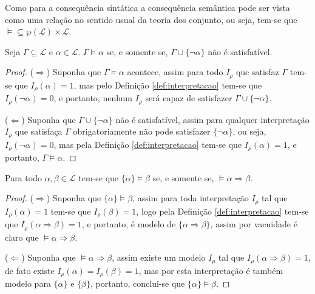 \begin{dica}
  Como para a consequência sintática a consequência semântica pode ser vista como uma relação no sentido usual da teoria dos conjunto, ou seja, tem-se que $\vDash \subseteq \wp(\mathcal{L}) \times \mathcal{L}$.
\end{dica}

\begin{teorema}\label{teo:TeoremaRefutacao}
  Seja $\Gamma \subseteq \mathcal{L}$ e $\alpha \in \mathcal{L}$. $\Gamma \vDash \alpha$ se, e somente se, $\Gamma \cup \{\neg \alpha\}$ não é satisfatível. 
\end{teorema}

\begin{proof}
  ($\Rightarrow$) Suponha que  $\Gamma \vDash \alpha$ acontece, assim para todo $I_\rho$ que satisfaz $\Gamma$ tem-se que $I_\rho(\alpha) = 1$, mas pelo Definição \ref{def:interpretacao} tem-se que $I_\rho(\neg \alpha) = 0$, e portanto, nenhum $I_\rho$ será capaz de satisfazer $\Gamma \cup \{\neg \alpha\}$. 
  
  ($\Leftarrow$) Suponha que $\Gamma \cup \{\neg \alpha\}$ não é satisfatível, assim para qualquer interpretação $I_\rho$ que satisfaça $\Gamma$ obrigatoriamente não pode satisfazer $\{\neg \alpha\}$, ou seja, $I_\rho(\neg \alpha) = 0$, mas pela Definição \ref{def:interpretacao} tem-se que $I_\rho( \alpha) = 1$, e portanto, $\Gamma \vDash \alpha$.
\end{proof}

\begin{teorema}\label{teo:TeoremaDeducaoSemantico}
  Para todo $\alpha, \beta \in \mathcal{L}$ tem-se que $\{\alpha\} \vDash \beta$ se, e somente se,  $\vDash \alpha \Rightarrow \beta$.
\end{teorema}

\begin{proof}
  ($\Rightarrow$) Suponha que $\{\alpha\} \vDash \beta$, assim para toda interpretação $I_\rho$ tal que $I_\rho(\alpha) = 1$ tem-se que $I_\rho(\beta) = 1$, logo pela Definição \ref{def:interpretacao} tem-se que $I_\rho(\alpha \Rightarrow \beta) = 1$, e portanto, é modelo de $\{\alpha \Rightarrow \beta\}$, assim por vacuidade é claro que $\vDash \alpha \Rightarrow \beta$.
  
  ($\Leftarrow$) Suponha que $\vDash \alpha \Rightarrow \beta$, assim existe um modelo $I_\rho$ tal que $I_\rho(\alpha \Rightarrow \beta) = 1$, de fato existe $I_\rho(\alpha) = I_\rho(\beta) = 1$, mas por esta interpretação é também modelo para $\{\alpha\}$ e $\{\beta\}$, portanto, conclui-se que  $\{\alpha\} \vDash \beta$.
\end{proof}

